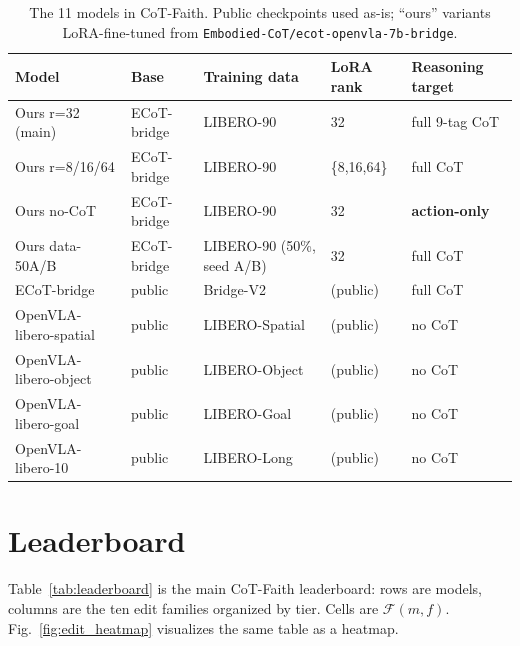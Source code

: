 \documentclass{article}
\begin{document}
\begin{table}[t]
\centering\small
\caption{The 11 models in CoT-Faith. Public checkpoints used as-is; ``ours'' variants LoRA-fine-tuned from \texttt{Embodied-CoT/ecot-openvla-7b-bridge}.}
\label{tab:models}
\begin{tabular}{l l l l l}
\toprule
Model & Base & Training data & LoRA rank & Reasoning target \\
\midrule
Ours r=32 (main) & ECoT-bridge & LIBERO-90 & 32 & full 9-tag CoT \\
Ours r=8/16/64 & ECoT-bridge & LIBERO-90 & \{8,16,64\} & full CoT \\
Ours no-CoT & ECoT-bridge & LIBERO-90 & 32 & \textbf{action-only} \\
Ours data-50A/B & ECoT-bridge & LIBERO-90 (50\%, seed A/B) & 32 & full CoT \\
ECoT-bridge & public & Bridge-V2 & (public) & full CoT \\
OpenVLA-libero-spatial & public & LIBERO-Spatial & (public) & no CoT \\
OpenVLA-libero-object & public & LIBERO-Object & (public) & no CoT \\
OpenVLA-libero-goal & public & LIBERO-Goal & (public) & no CoT \\
OpenVLA-libero-10 & public & LIBERO-Long & (public) & no CoT \\
\bottomrule
\end{tabular}
\end{table}

\section{Leaderboard}
\label{sec:results}

Table~\ref{tab:leaderboard} is the main CoT-Faith leaderboard: rows are models, columns are the ten edit families organized by tier. Cells are $\mathcal{F}(m, f)$. Fig.~\ref{fig:edit_heatmap} visualizes the same table as a heatmap.
\end{document}
